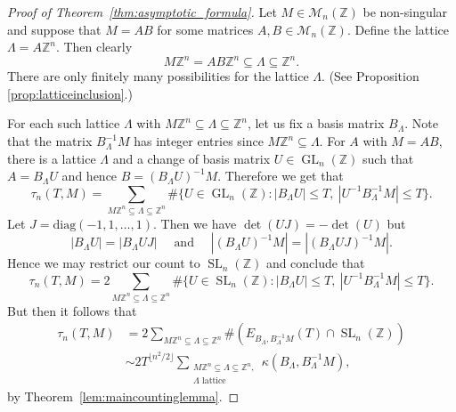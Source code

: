 \documentclass[11pt,reqno]{amsart}
\theoremstyle{definition}
\theoremstyle{remark}
\newcommand{\GL}{\operatorname{GL}}
\newcommand{\SL}{\operatorname{SL}}
\numberwithin{equation}{section}
\numberwithin{thm}{section}
\numberwithin{table}{section}
\def \Z {{\mathbb Z}}
\newcommand{\ZZ}{\mathbb Z}
\begin{document}
\begin{proof}[Proof of Theorem~\ref{thm:asymptotic_formula}]
Let $M\in \mathcal{M}_n(\ZZ)$ be non-singular and suppose that  $M = AB$ for some matrices $A,B \in \mathcal{M}_{n}(\Z)$. 
Define the lattice $\mathsf{\Lambda} =A\Z^n$. Then clearly  
    \[
    M \Z^n = AB\Z^n \subseteq \mathsf{\Lambda}  \subseteq \Z^n. 
    \]
    There are only finitely many possibilities for the lattice $\mathsf{\Lambda}$. (See 
    Proposition \ref{prop:latticeinclusion}.)
    
    For each such lattice $\mathsf{\Lambda}$
    with $M\Z^n \subseteq \mathsf{\Lambda} \subseteq \Z^n$, let us fix a basis matrix $B_\mathsf{\Lambda}$. 
       Note that the matrix $B_{\mathsf\Lambda}^{-1}M$ has integer entries since 
$M \Z^n \subseteq \mathsf{\Lambda}$.
 For $A$ with $M= AB$, there is a lattice $\mathsf{\Lambda}$
    and a change of basis matrix $U \in \GL_n(\Z)$
    such that 
   $
    A =  B_\mathsf{\Lambda} U
    $ and hence $B = (B_\mathsf{\Lambda} U)^{-1}M$. Therefore we get that 
    \[
    \tau_n(T,M) 
    =
    \sum_{M\Z^n \subseteq \mathsf{\Lambda} \subseteq \Z^n} \# \{ 
    U \in \GL_n(\Z): | B_\mathsf{\Lambda} U | \le T, \: | U^{-1}B_\mathsf{\Lambda}^{-1}M|\le T
    \}.
    \]
    Let $J = \mathrm{diag}(-1,1,\ldots,1)$. Then we have $\det(UJ) = - \det(U)$ but
    \[
    | B_\mathsf{\Lambda} U | = |  B_\mathsf{\Lambda} U J | \quad \text{ and } 
    \quad 
    | (B_\mathsf{\Lambda} U)^{-1}M| =
    | (B_\mathsf{\Lambda} U J)^{-1}M|.
    \]
    Hence we may restrict our count to $\SL_n(\Z)$ and conclude that 
    \begin{equation}\label{eq:chicken}
        \tau_n(T,M) 
    =
    2
    \sum_{M\Z^n \subseteq \mathsf{\Lambda} \subseteq \Z^n} \# \{ 
    U \in \SL_n(\Z):  | B_\mathsf{\Lambda} U | \le T, \: | U^{-1}B_\mathsf{\Lambda}^{-1}M|\le T
    \}. 
    \end{equation}
But then it follows that 
\begin{align*}    
     \tau_n(T,M) 
    &=
    2
    \sum_{M\Z^n \subseteq \mathsf{\Lambda} \subseteq \Z^n} \# (E_{B_\mathsf{\Lambda}, B_\mathsf{\Lambda}^{-1}M}(T)\cap \SL_n(\Z)) 
    \\
    & \sim 2 T^{\lfloor n^2/2 \rfloor}
    \sum_{
    \substack{
    M \Z^n \subseteq \mathsf{\Lambda} \subseteq \Z^n, \\
    \mathsf{\Lambda} \text{ lattice }
    }
    }
    \kappa (B_\mathsf{\Lambda}, B_\mathsf{\Lambda}^{-1}M),
    \end{align*}
by  Theorem~\ref{lem:maincountinglemma}. 
\end{proof}
\end{document}
